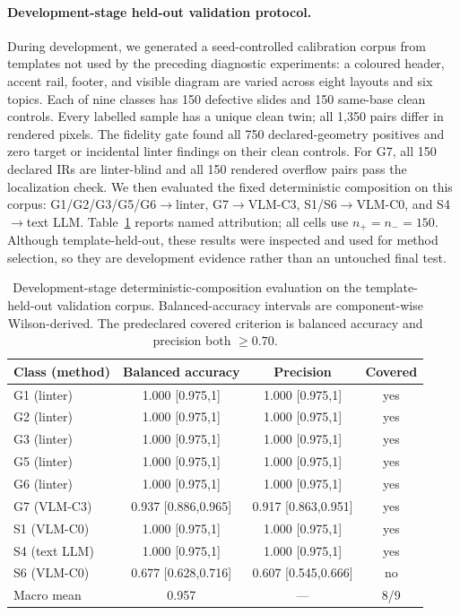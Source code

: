 \documentclass[11pt]{article}
\newcommand{\g}[1]{\textsf{#1}}
\begin{document}
\paragraph{Development-stage held-out validation protocol.}
During development, we generated a seed-controlled calibration corpus from
templates not used by the preceding diagnostic experiments: a coloured header, accent rail, footer, and
visible diagram are varied across eight layouts and six topics. Each of nine
classes has 150 defective slides and 150 same-base clean controls. Every
labelled sample has a unique clean twin; all 1,350 pairs differ in rendered
pixels. The fidelity gate found all 750 declared-geometry positives and zero
target or incidental linter findings on their clean controls. For \g{G7}, all
150 declared IRs are linter-blind and all 150 rendered overflow pairs pass the
localization check. We then evaluated the fixed deterministic composition on this corpus:
\g{G1}/\g{G2}/\g{G3}/\g{G5}/\g{G6}$\to$linter,
\g{G7}$\to$VLM-C3, \g{S1}/\g{S6}$\to$VLM-C0, and
\g{S4}$\to$text LLM. Table~\ref{tab:w5-heldout} reports named attribution;
all cells use $n_+=n_-=150$. Although template-held-out, these results were
inspected and used for method selection, so they are development evidence rather
than an untouched final test.

\begin{table}[h]
\centering
\small
\caption{Development-stage deterministic-composition evaluation on the
template-held-out validation corpus. Balanced-accuracy intervals are component-wise Wilson-derived. The predeclared covered
criterion is balanced accuracy and precision both $\ge 0.70$.}
\label{tab:w5-heldout}
\begin{tabular}{@{}lccc@{}}
\toprule
Class (method) & Balanced accuracy & Precision & Covered \\
\midrule
\g{G1} (linter) & 1.000 [0.975,1] & 1.000 [0.975,1] & yes \\
\g{G2} (linter) & 1.000 [0.975,1] & 1.000 [0.975,1] & yes \\
\g{G3} (linter) & 1.000 [0.975,1] & 1.000 [0.975,1] & yes \\
\g{G5} (linter) & 1.000 [0.975,1] & 1.000 [0.975,1] & yes \\
\g{G6} (linter) & 1.000 [0.975,1] & 1.000 [0.975,1] & yes \\
\g{G7} (VLM-C3) & 0.937 [0.886,0.965] & 0.917 [0.863,0.951] & yes \\
\g{S1} (VLM-C0) & 1.000 [0.975,1] & 1.000 [0.975,1] & yes \\
\g{S4} (text LLM) & 1.000 [0.975,1] & 1.000 [0.975,1] & yes \\
\g{S6} (VLM-C0) & 0.677 [0.628,0.716] & 0.607 [0.545,0.666] & no \\
\midrule
Macro mean & 0.957 & --- & 8/9 \\
\bottomrule
\end{tabular}
\end{table}
\end{document}

